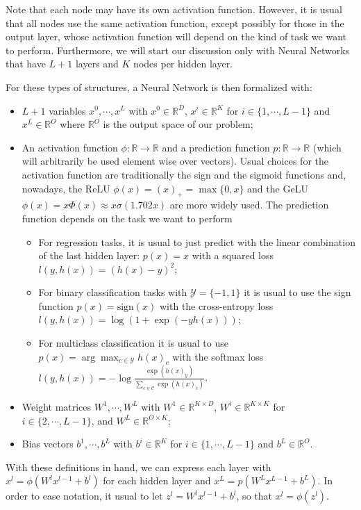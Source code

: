\documentclass{article}
\newcommand{\R}{\mathbb{R}}
\begin{document}
Note that each node may have its own activation function. 
However, it is usual that all nodes use the same activation function, except possibly for those in the output layer, whose activation function will depend on the kind of task we want to perform.
Furthermore, we will start our discussion only with Neural Networks that have $L+1$ layers and $K$ nodes per hidden layer.

For these types of structures, a Neural Network is then formalized with:
\begin{itemize}
    \item $L+1$ variables $x^0, \cdots, x^L$ with $x^0 \in \R^D$, $x^i \in \R^K$ for $i \in \{1, \cdots, L-1\}$ and $x^L \in \R^O$ where $\R^O$ is the output space of our problem;
    \item An activation function $\phi : \R \to \R$ and a prediction function $p : \R \to \R$ (which will arbitrarily be used element wise over vectors).
	Usual choices for the activation function are traditionally the sign and the sigmoid functions and, nowadays, the ReLU $\phi(x) = (x)_+ = \max\{0,x\}$ and the GeLU $\phi(x) = x \Phi(x) \approx x \sigma(1.702x)$ are more widely used.
	The prediction function depends on the task we want to perform
	\begin{itemize}
	    \item For regression tasks, it is usual to just predict with the linear combination of the last hidden layer: 
		$p(x) = x$ 
		with a squared loss 
		$l(y, h(x)) = (h(x) - y)^2$;
	    \item For binary classification tasks with $\mathcal{Y} = \{-1, 1\}$ it is usual to use the sign function 
		$p(x) = \text{sign}(x)$
		with the cross-entropy loss
		$l(y, h(x)) = \log(1 + \exp(-yh(x)))$;
	    \item For multiclass classification it is usual to use 
		$p(x) = \arg \max_{c \in \mathcal{Y}} h(x)_c$
		with the softmax loss
		$l(y, h(x)) = -\log \frac{\exp(h(x)_y)}{\sum_{c \in \mathcal{C}} \exp(h(x)_c)}$.
	\end{itemize}
    \item Weight matrices $W^1, \cdots, W^L$ with $W^1 \in \R^{K \times D}$, $W^i \in \R^{K \times K}$ for $i \in \{2, \cdots, L-1\}$, and $W^L \in \R^{O \times K}$;
    \item Bias vectors $b^1, \cdots, b^L$ with $b^i \in \R^K$ for $i \in \{1, \cdots, L-1\}$ and $b^L \in \R^O$.
\end{itemize}

With these definitions in hand, we can express each layer with $x^l = \phi(W^l x^{l-1} + b^l)$ for each hidden layer and $x^L = p(W^L x^{L-1} + b^L)$.
In order to ease notation, it usual to let $z^l = W^l x^{l-1} + b^l$, so that $x^l = \phi(z^l)$.
\end{document}
